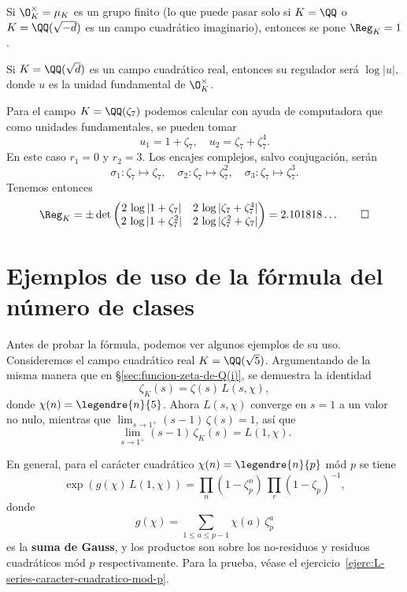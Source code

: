 Si $\O_K^\times = \mu_K$ es un grupo finito (lo que puede pasar solo si
$K = \QQ$ o $K = \QQ (\sqrt{-d})$ es un campo cuadrático imaginario),
entonces se pone $\Reg_K = 1$.

\begin{ejemplo}
  Si $K = \QQ (\sqrt{d})$ es un campo cuadrático real, entonces su regulador
  será $\log |u|$, donde $u$ es la unidad fundamental de $\O_K^\times$.
\end{ejemplo}

\begin{ejemplo}
  Para el campo $K = \QQ (\zeta_7)$ podemos calcular con ayuda de computadora
  que como unidades fundamentales, se pueden tomar
  $$u_1 = 1 + \zeta_7, \quad u_2 = \zeta_7 + \zeta_7^4.$$
  En este caso $r_1 = 0$ y $r_2 = 3$. Los encajes complejos, salvo conjugación,
  serán
  \[ \sigma_1\colon \zeta_7 \mapsto \zeta_7, \quad
     \sigma_2\colon \zeta_7 \mapsto \zeta_7^2, \quad
     \sigma_3\colon \zeta_7 \mapsto \zeta_7^3. \]
  Tenemos entonces
  \[ \Reg_K = \pm\det\begin{pmatrix}
    2\,\log |1 + \zeta_7| & 2\,\log |\zeta_7 + \zeta_7^4| \\
    2\,\log |1 + \zeta_7^2| & 2\,\log |\zeta_7^2 + \zeta_7| \\
  \end{pmatrix} = 2.101818\ldots \qedhere \]
\end{ejemplo}


\section{Ejemplos de uso de la fórmula del número de clases}

Antes de probar la fórmula, podemos ver algunos ejemplos de su uso. Consideremos
el campo cuadrático real $K = \QQ (\sqrt{5})$. Argumentando de la misma manera
que en \S\ref{sec:funcion-zeta-de-Q(i)}, se demuestra la identidad
$$\zeta_K (s) = \zeta (s) \, L (s,\chi),$$
donde $\chi (n) = \legendre{n}{5}$.
Ahora $L (s,\chi)$ converge en $s = 1$ a un valor no nulo, mientras que
$\lim_{s\to 1^+} (s - 1)\,\zeta (s) = 1$, así que
$$\lim_{s \to 1^+} (s - 1)\,\zeta_K (s) = L (1,\chi).$$

En general, para el carácter cuadrático $\chi (n) = \legendre{n}{p}$ mód $p$
se tiene
$$\exp (g (\chi)\,L (1,\chi)) = \prod_n (1 - \zeta_p^n)\,\prod_r (1 - \zeta_p)^{-1},$$
donde
$$g (\chi) = \sum_{1 \le a \le p-1} \chi (a)\,\zeta_p^a$$
es la \textbf{suma de Gauss}, y los productos son sobre los no-residuos y
residuos cuadráticos mód $p$ respectivamente. Para la prueba, véase
el ejercicio~\ref{ejerc:L-series-caracter-cuadratico-mod-p}.

